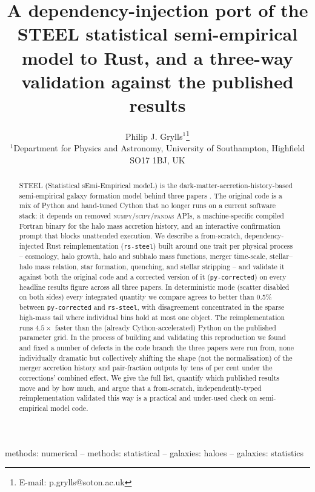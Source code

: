 \documentclass[fleqn,usenatbib]{mnras}
\title[STEEL in Rust]{A dependency-injection port of the STEEL statistical semi-empirical model to Rust, and a three-way validation against the published results}
\author[Grylls et al.]{
Philip J. Grylls$^{1}$\thanks{E-mail: p.grylls@soton.ac.uk}
\\
$^{1}$Department for Physics and Astronomy, University of Southampton, Highfield SO17 1BJ, UK
}
\begin{document}
\label{firstpage}
\pagerange{\pageref{firstpage}--\pageref{LastPage}}
\maketitle

\begin{abstract}
STEEL (Statistical sEmi-Empirical modeL) is the dark-matter-accretion-history-based
semi-empirical galaxy formation model behind three papers
\citep{Grylls2019a,Grylls2020,Grylls2020b}. The original code is a mix of
Python and hand-tuned Cython that no longer runs on a current software
stack: it depends on removed \textsc{numpy}/\textsc{scipy}/\textsc{pandas}
APIs, a machine-specific compiled Fortran binary for the halo mass
accretion history, and an interactive confirmation prompt that blocks
unattended execution. We describe a from-scratch, dependency-injected
Rust reimplementation (\texttt{rs-steel}) built around one trait per
physical process -- cosmology, halo growth, halo and subhalo mass
functions, merger time-scale, stellar--halo mass relation, star
formation, quenching, and stellar stripping -- and validate it against
both the original code and a corrected version of it (\texttt{py-corrected}) on
every headline results figure across all three papers. In deterministic
mode (scatter disabled on both sides) every integrated quantity we
compare agrees to better than 0.5\% between \texttt{py-corrected} and
\texttt{rs-steel}, with disagreement concentrated in the sparse
high-mass tail where individual bins hold at most one object. The
reimplementation runs $4.5\times$ faster than the (already
Cython-accelerated) Python on the published parameter grid. In the
process of building and validating this reproduction we found and fixed
a number of defects in the code branch the three papers were run from,
none individually dramatic but collectively shifting the shape (not the
normalisation) of the merger accretion history and pair-fraction outputs
by tens of per cent under the corrections' combined effect. We give the
full list, quantify which published results move and by how much, and
argue that a from-scratch, independently-typed reimplementation
validated this way is a practical and under-used check on
semi-empirical model code.
\end{abstract}

\begin{keywords}
methods: numerical -- methods: statistical -- galaxies: haloes -- galaxies: statistics
\end{keywords}
\end{document}
